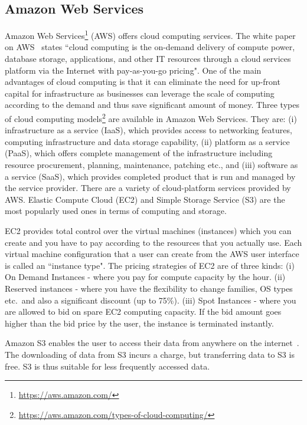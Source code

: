 \subsection{Amazon Web Services}
Amazon Web Services\footnote{\url{https://aws.amazon.com/}} (AWS) 
offers cloud computing services. The white paper on 
AWS~\cite{Amazon-Web-Services} states ``cloud computing is the 
on-demand delivery of compute power, database storage, applications, 
and other IT resources through a cloud services platform via the 
Internet with pay-as-you-go pricing". One of the main advantages of 
cloud computing is that it can eliminate the need for up-front capital 
for infrastructure as businesses can leverage the scale of computing 
according to the demand and thus save significant amount of money. 
Three types of cloud computing models\footnote{\url{https://aws.amazon.com/types-of-cloud-computing/}} 
are available in Amazon Web Services. They are: (i) infrastructure as a service (IaaS), which provides access to 
networking features, computing infrastructure and data storage 
capability, (ii) platform as a service (PaaS), which offers complete 
management of the infrastructure including resource procurement, 
planning, maintenance, patching etc., and (iii) software as a service 
(SaaS), which provides completed product that is run and managed by the 
service provider. There are a variety of cloud-platform services 
provided by AWS. Elastic Compute Cloud (EC2) and Simple Storage Service 
(S3) are the most popularly used ones in terms of computing and storage.

EC2 provides total control over the virtual machines (instances) which you can create and you have to pay according to the resources that you actually use. Each virtual machine configuration that a user can create from the AWS user interface is called an ``instance type". The pricing strategies of EC2 are of three kinds: (i) On Demand Instances - where you pay for compute capacity by the hour. (ii) Reserved instances - where you have the flexibility to change families, OS types etc.\ and also a significant discount (up to 75\%). (iii) Spot Instances - where you are allowed to bid on spare EC2 computing capacity. If the bid amount goes higher than the bid price by the user, the instance is terminated instantly.

Amazon S3 enables the user to access their data from anywhere on the internet~\cite{Amazon-Web-Services}. The downloading of data from S3 incurs a charge, but transferring data to S3 is free. S3 is thus suitable for less frequently accessed data.

